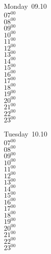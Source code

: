 \documentclass[11pt, a4paper]{book}\usepackage[]{graphicx}\usepackage[]{color}
\begin{document}
\begin{headerbox}
\end{headerbox}
\begin{weekdaybox}
  Monday~09.10\\
  { 
  \vfill
  $07^{00}$\\
$08^{00}$\\
$09^{00}$\\
$10^{00}$\\
$11^{00}$\\
$12^{00}$\\
$13^{00}$\\
$14^{00}$\\
$15^{00}$\\
$16^{00}$\\
$17^{00}$\\
$18^{00}$\\
$19^{00}$\\
$20^{00}$\\
$21^{00}$\\
$22^{00}$\\
$23^{00}$\\
  }
\end{weekdaybox}
\begin{weekdaybox}
  Tuesday~10.10\\
  { 
  \vfill
  $07^{00}$\\
$08^{00}$\\
$09^{00}$\\
$10^{00}$\\
$11^{00}$\\
$12^{00}$\\
$13^{00}$\\
$14^{00}$\\
$15^{00}$\\
$16^{00}$\\
$17^{00}$\\
$18^{00}$\\
$19^{00}$\\
$20^{00}$\\
$21^{00}$\\
$22^{00}$\\
$23^{00}$\\
  }
\end{weekdaybox}
\end{document}
